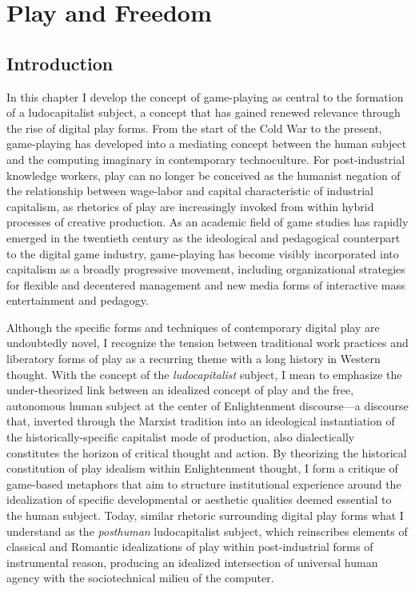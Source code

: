 \chapter{Play and Freedom}
\label{play}
\section*{Introduction}
In this chapter I develop the concept of game-playing as central to the formation of a ludocapitalist subject, a concept that has gained renewed relevance through the rise of digital play forms. From the start of the Cold War to the present, game-playing has developed into a mediating concept between the human subject and the computing imaginary in contemporary technoculture. For post-industrial knowledge workers, play can no longer be conceived as the humanist negation of the relationship between wage-labor and capital characteristic of industrial capitalism, as rhetorics of play are increasingly invoked from within hybrid processes of creative production. As an academic field of game studies has rapidly emerged in the twentieth century as the ideological and pedagogical counterpart to the digital game industry, game-playing has become visibly incorporated into capitalism as a broadly progressive movement, including organizational strategies for flexible and decentered management and new media forms of interactive mass entertainment and pedagogy.

Although the specific forms and techniques of contemporary digital play are undoubtedly novel, I recognize the tension between traditional work practices and liberatory forms of play as a recurring theme with a long history in Western thought. With the concept of the \emph{ludocapitalist} subject, I mean to emphasize the under-theorized link between an idealized concept of play and the free, autonomous human subject at the center of Enlightenment discourse---a discourse that, inverted through the Marxist tradition into an ideological instantiation of the historically-specific capitalist mode of production, also dialectically constitutes the horizon of critical thought and action. By theorizing the historical constitution of play idealism within Enlightenment thought, I form a critique of game-based metaphors that aim to structure institutional experience around the idealization of specific developmental or aesthetic qualities deemed essential to the human subject. Today, similar rhetoric surrounding digital play forms what I understand as the \emph{posthuman} ludocapitalist subject, which reinscribes elements of classical and Romantic idealizations of play within post-industrial forms of instrumental reason, producing an idealized intersection of universal human agency with the sociotechnical milieu of the computer.


